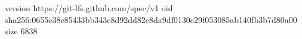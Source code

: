 version https://git-lfs.github.com/spec/v1
oid sha256:0655e38c85433bb343c8d92dd82c8da9df0130e29f053085ab140fb3b7d80a00
size 6838
